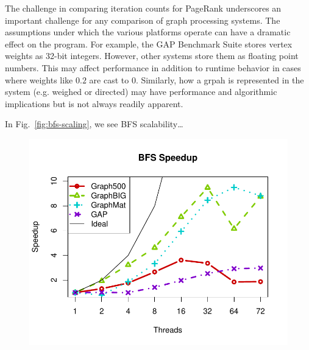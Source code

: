 \documentclass{llncs}
\begin{document}
The challenge in comparing iteration counts for PageRank underscores an important challenge for any comparison of graph processing systems. The assumptions under which the various platforms operate can have a dramatic effect on the program. For example, the GAP Benchmark Suite stores vertex weights as 32-bit integers. However, other systems store them as floating point numbers. This may affect performance in addition to runtime behavior in cases where weights like $0.2$ are cast to $0$. Similarly, how a grpah is represented in the system (e.g. weighed or directed) may have performance and algorithmic implications but is not always readily apparent.

In Fig.~\ref{fig:bfs-scaling}, we see BFS scalability\dots
\begin{figure}
	\centering
	\begin{minipage}{0.55\linewidth}
		\includegraphics[width=\linewidth, trim=0 18pt 18pt 0, clip]{graphics/bfs_speedup.pdf}
	\end{minipage}
	\begin{minipage}{0.425\linewidth}

\end{minipage}
\end{figure}
\end{document}
